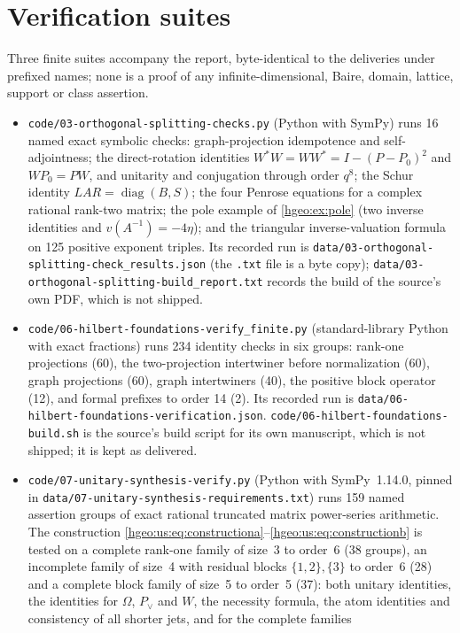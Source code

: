 \documentclass[11pt,letterpaper]{article}
\numberwithin{equation}{section}
\theoremstyle{definition}
\theoremstyle{remark}
\newcommand{\diag}{\operatorname{diag}}
\newcommand{\fn}[1]{\nolinkurl{#1}}
\begin{document}
\section{Verification suites}\label{hgeo:app:verification}
Three finite suites accompany the report, byte-identical to the deliveries
under prefixed names; none is a proof of any infinite-dimensional, Baire,
domain, lattice, support or class assertion.
\begin{itemize}[leftmargin=*]
\item \fn{code/03-orthogonal-splitting-checks.py} (Python with SymPy) runs 16
named exact symbolic checks: graph-projection idempotence and self-adjointness;
the direct-rotation identities $W^*W=WW^*=I-(P-P_0)^2$ and $WP_0=PW$, and
unitarity and conjugation through order $q^8$; the Schur identity
$LAR=\diag(B,S)$; the four Penrose equations for a complex rational rank-two
matrix; the pole example of \cref{hgeo:ex:pole} (two inverse identities and
$v(A^{-1})=-4\eta$); and the triangular inverse-valuation formula on 125
positive exponent triples. Its recorded run is
\fn{data/03-orthogonal-splitting-check_results.json} (the \texttt{.txt}
file is a byte copy); \fn{data/03-orthogonal-splitting-build_report.txt}
records the build of the source's own PDF, which is not shipped.
\item \fn{code/06-hilbert-foundations-verify_finite.py} (standard-library
Python with exact fractions) runs 234 identity checks in six groups: rank-one
projections (60), the two-projection intertwiner before normalization (60),
graph projections (60), graph intertwiners (40), the positive block operator
(12), and formal prefixes to order 14 (2). Its recorded run is
\fn{data/06-hilbert-foundations-verification.json}.
\fn{code/06-hilbert-foundations-build.sh} is the source's build script for
its own manuscript, which is not shipped; it is kept as delivered.
\item \fn{code/07-unitary-synthesis-verify.py} (Python with SymPy~1.14.0,
pinned in \fn{data/07-unitary-synthesis-requirements.txt}) runs 159 named
assertion groups of exact rational truncated matrix power-series arithmetic.
The construction
\eqref{hgeo:us:eq:constructiona}--\eqref{hgeo:us:eq:constructionb} is tested
on a complete rank-one family of size~3 to order~6 (38 groups), an incomplete
family of size~4 with residual blocks $\{1,2\},\{3\}$ to order~6 (28) and a
complete block family of size~5 to order~5 (37): both unitary identities, the
identities for $\Omega$, $P_\vee$ and $W$, the necessity formula, the atom
identities and consistency of all shorter jets, and for the complete families

\end{itemize}
\end{document}
